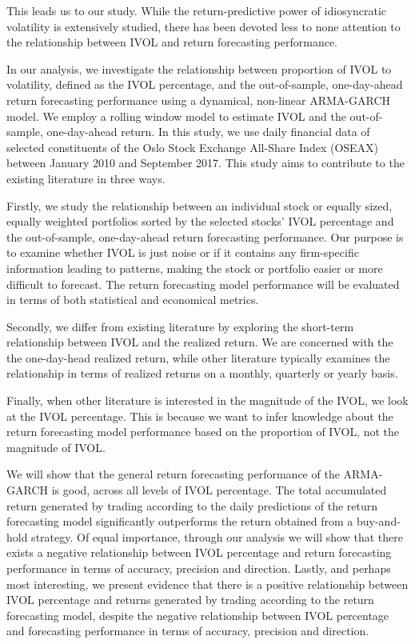 This leads us to our study. While the return-predictive power of idiosyncratic volatility is extensively studied, there has been devoted less to none attention to the relationship between IVOL and return forecasting performance. 

In our analysis, we investigate the relationship between proportion of IVOL to volatility, defined as the IVOL percentage, and the out-of-sample, one-day-ahead return forecasting performance using a dynamical, non-linear ARMA-GARCH model. We employ a rolling window model to estimate IVOL and the out-of-sample, one-day-ahead return. In this study, we use daily financial data of selected constituents of the Oslo Stock Exchange All-Share Index (OSEAX) between January 2010 and September 2017. This study aims to contribute to the existing literature in three ways. 

Firstly, we study the relationship between an individual stock or equally sized, equally weighted portfolios sorted by the selected stocks' IVOL percentage and the out-of-sample, one-day-ahead return forecasting performance. Our purpose is to examine whether IVOL is just noise or if it contains any firm-specific information leading to patterns, making the stock or portfolio easier or more difficult to forecast. The return forecasting model performance will be evaluated in terms of both statistical and economical metrics.

Secondly, we differ from existing literature by exploring the short-term relationship between IVOL and the realized return. We are concerned with the the one-day-head realized return, while other literature typically examines the relationship in terms of realized returns on a monthly, quarterly or yearly basis.

Finally, when other literature is interested in the magnitude of the IVOL, we look at the IVOL percentage. This is because we want to infer knowledge about the return forecasting model performance based on the proportion of IVOL, not the magnitude of IVOL.

We will show that the general return forecasting performance of the ARMA-GARCH is good, across all levels of IVOL percentage. The total accumulated return generated by trading according to the daily predictions of the return forecasting model significantly outperforms the return obtained from a buy-and-hold strategy. Of equal importance, through our analysis we will show that there exists a negative relationship between IVOL percentage and return forecasting performance in terms of accuracy, precision and direction. Lastly, and perhaps most interesting, we present evidence that there is a positive relationship between IVOL percentage and returns generated by trading according to the return forecasting model, despite the negative relationship between IVOL percentage and forecasting performance in terms of accuracy, precision and direction. 

